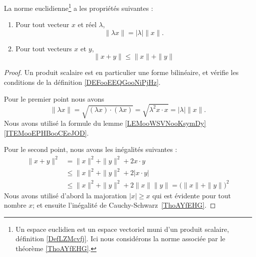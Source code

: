 \begin{proposition}     \label{PROPooVSVMooZrqxdc}
    La norme euclidienne\footnote{Un espace euclidien est un espace vectoriel muni d'un produit scalaire, définition \ref{DefLZMcvfj}. Ici nous considérons la norme associée par le théorème \ref{ThoAYfEHG}.} a les propriétés suivantes :
	\begin{enumerate}
		\item
		      Pour tout vecteur \( x\) et réel \( \lambda\),  
              \begin{equation}
                \| \lambda x \|=| \lambda |\| x \|.
              \end{equation}
		\item
		      Pour tout vecteurs \( x\) et \( y\), 
              \begin{equation}
                \| x+y \|\leq \| x \|+\| y \|
              \end{equation}
	\end{enumerate}
\end{proposition}

\begin{proof}
    Un produit scalaire est en particulier une forme bilinéaire, et vérifie les conditions de la définition \ref{DEFooEEQGooNiPjHz}.

    Pour le premier point nous avons
    \begin{equation}
        \| \lambda x\|=\sqrt{ (\lambda x)\cdot (\lambda x) }=\sqrt{ \lambda^2 x\cdot x }=| \lambda |\| x \|.
    \end{equation}
    Nous avons utilisé la formule du lemme \ref{LEMooWSVNooKsymDy}\ref{ITEMooEPHBooCEeJOD}.

	Pour le second point, nous avons les inégalités suivantes :
	\begin{subequations}
		\begin{align}
			\| x+y \|^2 & =\| x \|^2+\| y \|^2+2x\cdot y                                         \\
			            & \leq\| x \|^2+\| y \|^2+2|x\cdot y|                                    \\
			            & \leq\| x \|^2+\| y \|^2+2\| x \|\| y \| =\big( \| x \|+\| y \| \big)^2
		\end{align}
	\end{subequations}
	Nous avons utilisé d'abord la majoration \( | x |\geq x\) qui est évidente pour tout nombre \( x\); et ensuite l'inégalité de Cauchy-Schwarz~\ref{ThoAYfEHG}.
\end{proof}


